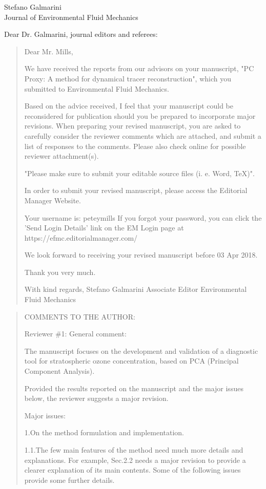 \documentclass{letter}
\begin{document}
\begin{letter}{Stefano Galmarini\\
Journal of Environmental Fluid Mechanics}

\opening{Dear Dr. Galmarini, journal editors and referees:}

\begin{quote}
Dear Mr. Mills,

We have received the reports from our advisors on your manuscript, "PC Proxy: A method for dynamical tracer reconstruction", which you submitted to Environmental Fluid Mechanics.

Based on the advice received, I feel that your manuscript could be reconsidered for publication should you be prepared to incorporate major revisions. When preparing your revised manuscript, you are asked to carefully consider the reviewer comments which are attached, and submit a list of responses to the comments. Please also check online for possible reviewer attachment(s).

"Please make sure to submit your editable source files (i. e. Word, TeX)".

In order to submit your revised manuscript, please access the Editorial Manager Website.

Your username is: peteymills
If you forgot your password, you can click the 'Send Login Details' link on the EM Login page at https://efmc.editorialmanager.com/

We look forward to receiving your revised manuscript before 03 Apr 2018.

Thank you very much.

With kind regards,
Stefano Galmarini
Associate Editor
Environmental Fluid Mechanics
\end{quote}

\begin{quote}
COMMENTS TO THE AUTHOR:

Reviewer \#1: General comment:

The manuscript focuses on the development and validation of a diagnostic tool for stratospheric ozone concentration, based on PCA (Principal Component Analysis).

Provided the results reported on the manuscript and the major issues below, the reviewer suggests a major revision.

Major issues:

1.On the method formulation and implementation.

1.1.The few main features of the method need much more details and explanations. For example, Sec.2.2 needs a major revision to provide a clearer explanation of its main contents. Some of the following issues provide some further details.


\end{quote}
\end{letter}
\end{document}
